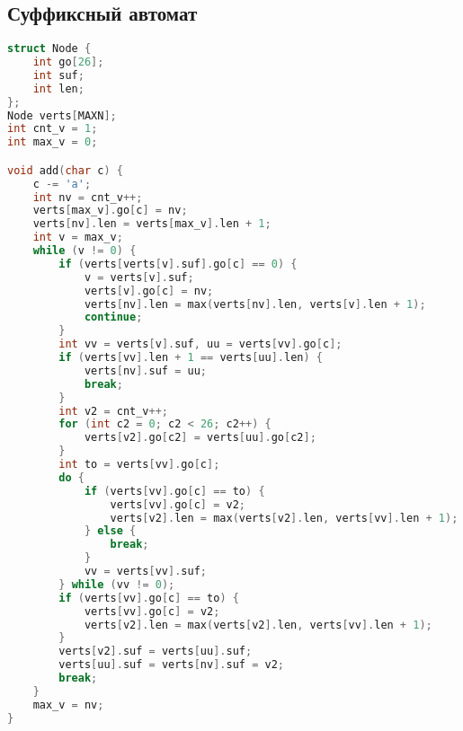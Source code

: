 \documentclass[10pt,a4paper,landscape,twosided]{extarticle}
\begin{document}
\begin{multicols}{3}
\begin{lstlisting}[language=C++]
\end{lstlisting}

\subsection{Суффиксный автомат}
\begin{lstlisting}[language=C++]
struct Node {
    int go[26];
    int suf;
    int len;
};
Node verts[MAXN];
int cnt_v = 1;
int max_v = 0;

void add(char c) {
    c -= 'a';
    int nv = cnt_v++;
    verts[max_v].go[c] = nv;
    verts[nv].len = verts[max_v].len + 1;
    int v = max_v;
    while (v != 0) {
        if (verts[verts[v].suf].go[c] == 0) {
            v = verts[v].suf;
            verts[v].go[c] = nv;
            verts[nv].len = max(verts[nv].len, verts[v].len + 1);
            continue;
        }
        int vv = verts[v].suf, uu = verts[vv].go[c];
        if (verts[vv].len + 1 == verts[uu].len) {
            verts[nv].suf = uu;
            break;
        }
        int v2 = cnt_v++;
        for (int c2 = 0; c2 < 26; c2++) {
            verts[v2].go[c2] = verts[uu].go[c2];
        }
        int to = verts[vv].go[c];
        do {
            if (verts[vv].go[c] == to) {
                verts[vv].go[c] = v2;
                verts[v2].len = max(verts[v2].len, verts[vv].len + 1);
            } else {
                break;
            }
            vv = verts[vv].suf;
        } while (vv != 0);
        if (verts[vv].go[c] == to) {
            verts[vv].go[c] = v2;
            verts[v2].len = max(verts[v2].len, verts[vv].len + 1);
        }
        verts[v2].suf = verts[uu].suf;
        verts[uu].suf = verts[nv].suf = v2;
        break;
    }
    max_v = nv;
}


\end{lstlisting}


\end{multicols}
\end{document}
